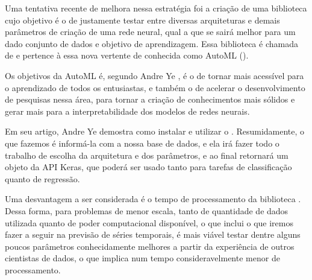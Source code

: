 Uma tentativa recente de melhora nessa estratégia foi a criação de uma biblioteca cujo objetivo é o de justamente testar entre diversas arquiteturas e demais parâmetros de criação de uma rede neural, qual a que se sairá melhor para um dado conjunto de dados e objetivo de aprendizagem. Essa biblioteca é chamada de  e pertence à essa nova vertente de  conhecida como AutoML ().

Os objetivos da AutoML é, segundo Andre Ye \citep{automl}, é o de tornar  mais acessível para o aprendizado de todos os entusiastas, e também o de acelerar o desenvolvimento de pesquisas nessa área, para tornar a criação de conhecimentos mais sólidos e gerar mais  para a interpretabilidade dos modelos de redes neurais.

Em seu artigo, Andre Ye \citep{automl} demostra como instalar e utilizar o . Resumidamente, o que fazemos é informá-la com a nossa base de dados, e ela irá fazer todo o trabalho de escolha da arquitetura e dos parâmetros, e ao final retornará um objeto da API Keras, que poderá ser usado tanto para tarefas de classificação quanto de regressão. 

Uma desvantagem a ser considerada é o tempo de processamento da biblioteca . Dessa forma, para problemas de menor escala, tanto de quantidade de dados utilizada quanto de poder computacional disponível, o que inclui o que iremos fazer a seguir na previsão de séries temporais, é mais viável testar dentre alguns poucos parâmetros conhecidamente melhores a partir da experiência de outros cientistas de dados, o que implica num tempo consideravelmente menor de processamento.
